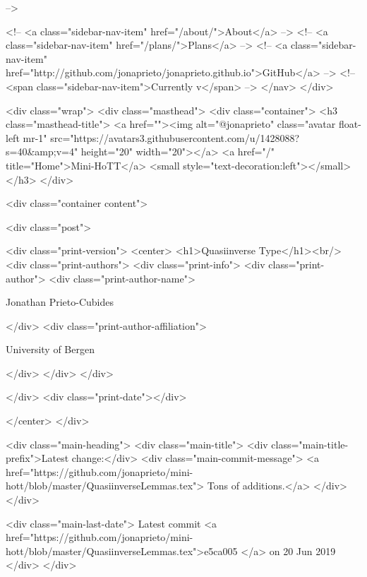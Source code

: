       
     -->

    <!-- <a class="sidebar-nav-item" href="/about/">About</a> -->
    <!-- <a class="sidebar-nav-item" href="/plans/">Plans</a> -->
    <!-- <a class="sidebar-nav-item" href="http://github.com/jonaprieto/jonaprieto.github.io">GitHub</a> -->
    <!-- <span class="sidebar-nav-item">Currently v</span> -->
  </nav>
</div>

    <div class="wrap">
      <div class="masthead">
        <div class="container">
          <h3 class="masthead-title">
            <a href=""><img alt="@jonaprieto" class="avatar float-left mr-1" src="https://avatars3.githubusercontent.com/u/1428088?s=40&amp;v=4" height="20" width="20"></a>
            <a href="/" title="Home">Mini-HoTT</a>
            <small style="text-decoration:left"></small>
          </h3>
        </div>
      
      <div class="container content">
        







<div class="post">

  <div class="print-version">
    <center>
      <h1>Quasiinverse Type</h1><br/>
        <div class="print-authors">
          <div class="print-info">
            <div class="print-author">
              <div class="print-author-name">
                
                  Jonathan Prieto-Cubides
                
              </div>
              <div class="print-author-affiliation">
                
                  University of Bergen
                
                </div>
            </div>
          </div>
          
          
        </div>
        <div class="print-date"></div>
        
        
    </center>
  </div>

  
  <div class="main-heading">
    <div class="main-title">
      <div class="main-title-prefix">Latest change:</div>
      <div class="main-commit-message">
            <a href="https://github.com/jonaprieto/mini-hott/blob/master/QuasiinverseLemmas.tex">
              Tons of additions.</a>
      </div>
    </div>

    <div class="main-last-date">
      Latest commit <a href="https://github.com/jonaprieto/mini-hott/blob/master/QuasiinverseLemmas.tex">e5ca005 </a> on  20 Jun 2019
    </div>
  </div>
  
